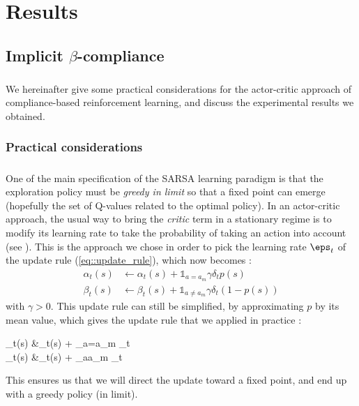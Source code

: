 \documentclass[a4paper]{report}
\begin{document}
{	\chapter{Results}
	{
		\label{chap::res}
	
		\section{Implicit $\beta$-compliance}
		{
			\paragraph{} We hereinafter give some practical considerations for the actor-critic approach of compliance-based reinforcement learning, and discuss the experimental results we obtained. 
			\subsection{Practical considerations}
			{
				\paragraph{} One of the main specification of the SARSA learning paradigm is that the exploration policy must be \emph{greedy in limit} so that a fixed point can emerge (hopefully the set of Q-values related to the optimal policy). In an actor-critic approach, the usual way to bring the \emph{critic} term in a stationary regime is to modify its learning rate to take the probability of taking an action into account (see \cite{Sutton98a}). \newline
				This is the approach we chose in order to pick the learning rate $\eps_t$ of the update rule (\ref{eq::update_rule}), which now becomes : 
			\begin{equation}
				\begin{aligned}
					\alpha_t(s) &\leftarrow \alpha_t(s) +  \mathds{1}_{a=a_m}\gamma \delta_t p(s)\\
					\beta_t(s) &\leftarrow \beta_t(s) +   \mathds{1}_{a\neq a_m}\gamma \delta_t (1-p(s))
				\end{aligned}
			\end{equation}
			with $\gamma >0$. This update rule can still be simplified, by approximating $p$ by its mean value, which gives the update rule that we applied in practice : 
			{
				\begin{aligned}
					\alpha_t(s) &\leftarrow \alpha_t(s) +  _{a=a_m} \delta_t \\
					\beta_t(s) &\leftarrow \beta_t(s) +   _{a\neq a_m}  \delta_t
				\end{aligned}
			}
			This ensures us that we will direct the update toward a fixed point, and end up with a greedy policy (in limit). 
			
}}}}
\end{document}
